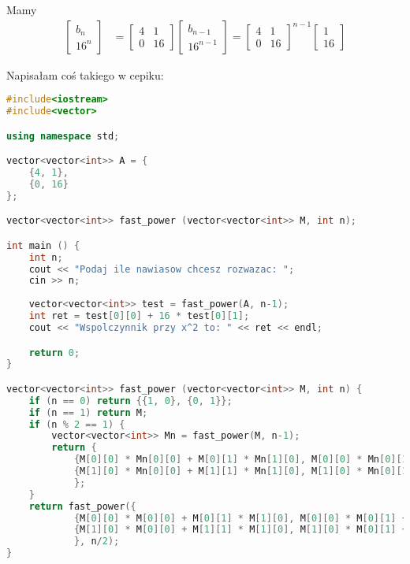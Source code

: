 \documentclass{article}
\begin{document}
Mamy
\begin{align*}
    \begin{bmatrix}
        b_n\\16^n
    \end{bmatrix}&=\begin{bmatrix}
        4 & 1\\
        0 & 16
    \end{bmatrix}\begin{bmatrix}
        b_{n-1}\\16^{n-1}
    \end{bmatrix}=\begin{bmatrix}
        4 & 1\\
        0 & 16
    \end{bmatrix}^{n-1}\begin{bmatrix}
        1\\
        16
    \end{bmatrix}
\end{align*}

Napisałam coś takiego w cepiku:
\begin{lstlisting}[language=c++]
#include<iostream>
#include<vector>

using namespace std;

vector<vector<int>> A = {
    {4, 1},
    {0, 16}
};

vector<vector<int>> fast_power (vector<vector<int>> M, int n);

int main () {
    int n;
    cout << "Podaj ile nawiasow chcesz rozwazac: ";
    cin >> n;
    
    vector<vector<int>> test = fast_power(A, n-1);
    int ret = test[0][0] + 16 * test[0][1];
    cout << "Wspolczynnik przy x^2 to: " << ret << endl;

    return 0;
}

vector<vector<int>> fast_power (vector<vector<int>> M, int n) {
    if (n == 0) return {{1, 0}, {0, 1}};
    if (n == 1) return M;
    if (n % 2 == 1) {
        vector<vector<int>> Mn = fast_power(M, n-1);
        return {
            {M[0][0] * Mn[0][0] + M[0][1] * Mn[1][0], M[0][0] * Mn[0][1] + M[0][1] * Mn[1][1]},
            {M[1][0] * Mn[0][0] + M[1][1] * Mn[1][0], M[1][0] * Mn[0][1] + M[1][1] * Mn[1][1]}
            };
    }
    return fast_power({
            {M[0][0] * M[0][0] + M[0][1] * M[1][0], M[0][0] * M[0][1] + M[0][1] * M[1][1]},
            {M[1][0] * M[0][0] + M[1][1] * M[1][0], M[1][0] * M[0][1] + M[1][1] * M[1][1]}
            }, n/2);
}
\end{lstlisting}
\end{document}
